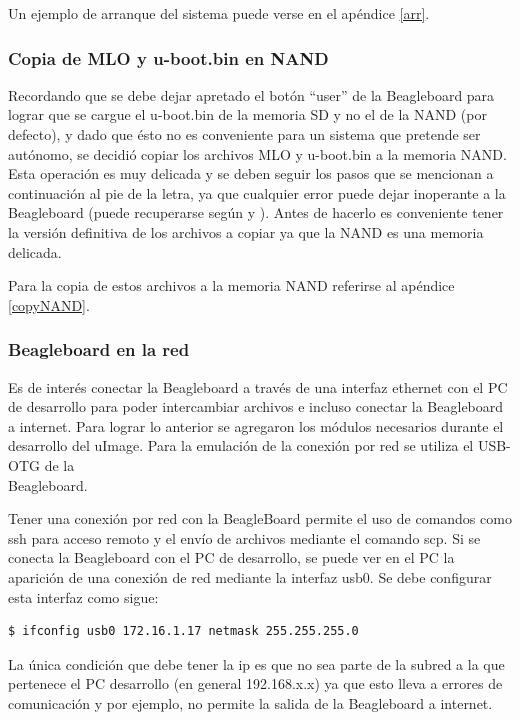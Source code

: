 Un ejemplo de arranque del sistema puede verse en el apéndice \ref{arr}.

\subsubsection{Copia de MLO y u-boot.bin en NAND}

Recordando que se debe dejar apretado el botón “user” de la Beagleboard para lograr que se cargue el u-boot.bin de la memoria SD y no el de la NAND (por defecto), y dado que ésto no es conveniente para un sistema que pretende ser autónomo, se decidió copiar los archivos MLO y u-boot.bin a la memoria NAND. Esta operación es muy delicada y se deben seguir los pasos que se mencionan a continuación al pie de la letra, ya que cualquier error puede dejar inoperante a la Beagleboard (puede recuperarse según \cite{rec} y \cite{rec1}). Antes de hacerlo es conveniente tener la versión definitiva de los archivos a copiar ya que la NAND es una memoria delicada.

\bigskip
Para la copia de estos archivos a la memoria NAND referirse al apéndice \ref{copyNAND}.

\subsubsection{Beagleboard en la red}

Es de interés conectar la Beagleboard a través de una interfaz ethernet con el PC de desarrollo para poder intercambiar archivos e incluso conectar la Beagleboard a internet. Para lograr lo anterior se agregaron los módulos necesarios durante el desarrollo del uImage. Para la emulación de la conexión por red se utiliza el USB-OTG de la \\
Beagleboard.

\bigskip
{}

\bigskip
Tener una conexión por red con la BeagleBoard permite el uso de comandos como ssh para acceso remoto y el envío de archivos mediante el comando scp. 
Si se conecta la Beagleboard con el PC de desarrollo, se puede ver en el PC la aparición de una conexión de red mediante la interfaz usb0. Se debe configurar esta interfaz como sigue:

\begin{verbatim}
$ ifconfig usb0 172.16.1.17 netmask 255.255.255.0
\end{verbatim}

La única condición que debe tener la ip es que no sea parte de la subred a la que pertenece el PC desarrollo (en general 192.168.x.x) ya que esto lleva a errores de comunicación y por ejemplo, no permite la salida de la Beagleboard a internet.

